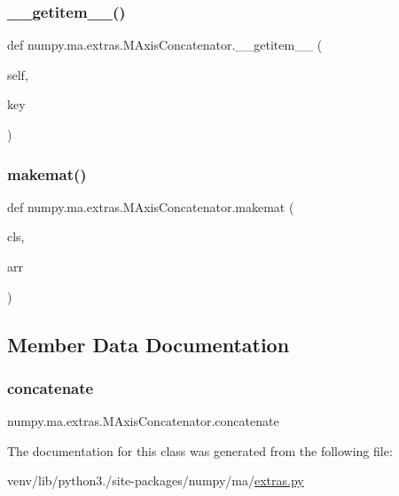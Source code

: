 \subsubsection{\texorpdfstring{\+\_\+\+\_\+getitem\+\_\+\+\_\+()}{\_\_getitem\_\_()}}
{\footnotesize\ttfamily def numpy.\+ma.\+extras.\+M\+Axis\+Concatenator.\+\_\+\+\_\+getitem\+\_\+\+\_\+ (\begin{DoxyParamCaption}\item[{}]{self,  }\item[{}]{key }\end{DoxyParamCaption})}

\mbox{\label{classnumpy_1_1ma_1_1extras_1_1MAxisConcatenator_a2fc8f8125419911fb994ab200f676883}} 
\subsubsection{\texorpdfstring{makemat()}{makemat()}}
{\footnotesize\ttfamily def numpy.\+ma.\+extras.\+M\+Axis\+Concatenator.\+makemat (\begin{DoxyParamCaption}\item[{}]{cls,  }\item[{}]{arr }\end{DoxyParamCaption})}



\subsection{Member Data Documentation}
\mbox{\label{classnumpy_1_1ma_1_1extras_1_1MAxisConcatenator_a08b40fa233a66b4fc3e572e74b54477f}} 
\subsubsection{\texorpdfstring{concatenate}{concatenate}}
{\footnotesize\ttfamily numpy.\+ma.\+extras.\+M\+Axis\+Concatenator.\+concatenate\hspace{0.3cm}{\ttfamily [static]}}



The documentation for this class was generated from the following file\+:\begin{DoxyCompactItemize}
\item 
venv/lib/python3./site-\/packages/numpy/ma/\hyperlink{extras_8py}{extras.\+py}\end{DoxyCompactItemize}

